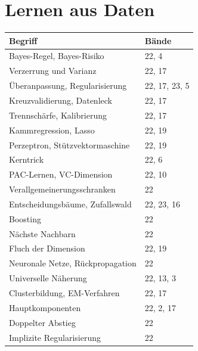 \section*{Lernen aus Daten}
\nopagebreak
{\small\renewcommand{\arraystretch}{1.32}
\begin{longtable}{@{}P{5.6cm}P{2.8cm}@{}}
\toprule
\textbf{Begriff} & \textbf{Bände}\\
\midrule
\endhead
Bayes-Regel, Bayes-Risiko & 22, 4\\
Verzerrung und Varianz & 22, 17\\
Überanpassung, Regularisierung & 22, 17, 23, 5\\
Kreuzvalidierung, Datenleck & 22, 17\\
Trennschärfe, Kalibrierung & 22, 17\\
Kammregression, Lasso & 22, 19\\
Perzeptron, Stützvektormaschine & 22, 19\\
Kerntrick & 22, 6\\
PAC-Lernen, VC-Dimension & 22, 10\\
Verallgemeinerungsschranken & 22\\
Entscheidungsbäume, Zufallswald & 22, 23, 16\\
Boosting & 22\\
Nächste Nachbarn & 22\\
Fluch der Dimension & 22, 19\\
Neuronale Netze, Rückpropagation & 22\\
Universelle Näherung & 22, 13, 3\\
Clusterbildung, EM-Verfahren & 22, 17\\
Hauptkomponenten & 22, 2, 17\\
Doppelter Abstieg & 22\\
Implizite Regularisierung & 22\\
\bottomrule
\end{longtable}}

